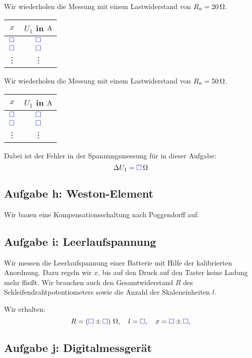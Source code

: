 \documentclass[11pt,german]{article}
\newcommand{\messwert}{\textcolor{blue}{\square}}
\newcommand{\emesswert}{\left(\messwert \pm \messwert \right)}
\begin{document}
Wir wiederholen die Messung mit einem Lastwiderstand von $R_a = \unit[20] \Omega$.

\begin{center}
	\begin{tabular}{cc}
		$x$ & $U_1$ in $\unit A$ \\
		\hline
		$\messwert$ & $\messwert$ \\
		$\messwert$ & $\messwert$ \\
			 \vdots & \vdots
	\end{tabular}
\end{center}

Wir wiederholen die Messung mit einem Lastwiderstand von $R_a = \unit[50] \Omega$.

\begin{center}
	\begin{tabular}{cc}
		$x$ & $U_1$ in $\unit A$ \\
		\hline
		$\messwert$ & $\messwert$ \\
		$\messwert$ & $\messwert$ \\
			 \vdots & \vdots
	\end{tabular}
\end{center}

Dabei ist der Fehler in der Spannungsmessung für in dieser Aufgabe:
\[ \Delta U_1 = \unit[\messwert] \Omega \]

\subsection{Aufgabe h: Weston-Element}

\label{durchführung-h}

Wir bauen eine Kompensationsschaltung nach Poggendorff auf.

\subsection{Aufgabe i: Leerlaufspannung}

\label{durchführung-i}

Wir messen die Leerlaufspannung einer Batterie mit Hilfe der kalibrierten
Anordnung. Dazu regeln wir $x$, bis auf den Druck auf den Taster keine Ladung
mehr fließt. Wir brauchen auch den Gesamtwiderstand $R$ des
Schleifendrahtpotentiometers sowie die Anzahl der Skaleneinheiten $l$.

Wir erhalten:
\[
	R = \unit[\emesswert]\Omega,
	\quad
	l = \messwert,
	\quad
	x = \messwert \pm \messwert,
\]

\subsection{Aufgabe j: Digitalmessgerät}
\end{document}
